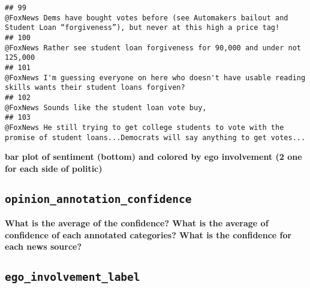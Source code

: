 \documentclass[
]{article}
\begin{document}
\begin{verbatim}
## 99                                                                                                                                                                     @FoxNews Dems have bought votes before (see Automakers bailout and Student Loan “forgiveness”), but never at this high a price tag!
## 100                                                                                                                                                                                                                          @FoxNews Rather see student loan forgiveness for 90,000 and under not 125,000
## 101                                                                                                                                                                                      @FoxNews I'm guessing everyone on here who doesn't have usable reading skills wants their student loans forgiven?
## 102                                                                                                                                                                                                                                                        @FoxNews Sounds like the student loan vote buy,
## 103                                                                                                                                                               @FoxNews He still trying to get college students to vote with the promise of student loans...Democrats will say anything to get votes...
\end{verbatim}

\textbf{bar plot of sentiment (bottom) and colored by ego involvement (2
one for each side of politic)}

\hypertarget{opinion_annotation_confidence}{%
\subsection{\texorpdfstring{\texttt{opinion\_annotation\_confidence}}{opinion\_annotation\_confidence}}\label{opinion_annotation_confidence}}

\textbf{What is the average of the confidence? What is the average of
confidence of each annotated categories? What is the confidence for each
news source? }

\hypertarget{ego_involvement_label}{%
\subsection{\texorpdfstring{\texttt{ego\_involvement\_label}}{ego\_involvement\_label}}\label{ego_involvement_label}}
\end{document}
